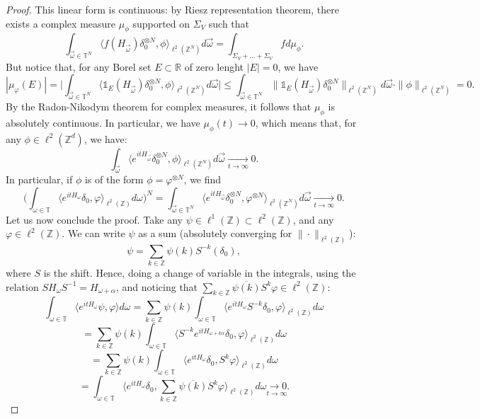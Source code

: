 \documentclass[a4paper]{article}
\theoremstyle{definition}
\begin{document}
\begin{proof}
This linear form is continuous: by Riesz representation theorem, there exists a complex measure $\mu_\phi$ supported on $\Sigma_V$ such that 
$$ \int_{\vec{\omega} \in \mathbb{T}^N} \langle f(H_{\vec{\omega}}) \delta_0^{\otimes N} ,\phi \rangle_{\ell^2(\mathbb{Z}^N)} d\vec{\omega} = \int_{\Sigma_V+\dots +\Sigma_V} f d\mu_\phi. $$
But notice that, for any Borel set $E\subset \mathbb{R}$ of zero lenght $|E|=0$, we have
$$ |\mu_\varphi(E)| = \Big| \int_{\vec{\omega} \in \mathbb{T}^N} \langle \mathbb{1}_E(H_{\vec{\omega}}) \delta_0^{\otimes N},\phi \rangle_{\ell^2(\mathbb{Z}^N)} d\vec{\omega} \Big| \leq \int_{\vec{\omega} \in \mathbb{T}^N} \| \mathbb{1}_E(H_{\vec{\omega}}) \delta_0^{\otimes N} \|_{\ell^2(\mathbb{Z}^N)} d\vec{\omega} \cdot \|\phi \|_{\ell^2(\mathbb{Z}^N)}  = 0. $$
By the Radon-Nikodym theorem for complex measures, it follows that $\mu_\phi$ is absolutely continuous. In particular, we have $ \widehat{\mu_\phi}(t) \rightarrow 0 $, which means that, for any $\phi \in \ell^2(\mathbb{Z}^d)$, we have:
$$ \int_{\vec{\omega}} \langle e^{it H_{\vec{\omega}}} \delta_0^{\otimes N}, \phi \rangle_{\ell^2(\mathbb{Z}^N)} d\vec{\omega} \underset{t \rightarrow \infty}{\longrightarrow} 0 . $$
In particular, if $\phi$ is of the form $\phi=\varphi^{\otimes N}$, we find
$$ \Big(\int_{\omega \in \mathbb{T}} \langle e^{it H_{\omega}} \delta_0, \varphi \rangle_{\ell^2(\mathbb{Z})} d{\omega} \Big)^N = \int_{\vec{\omega} \in \mathbb{T}^N} \langle e^{it H_{\vec{\omega}}} \delta_0^{\otimes N}, \varphi^{\otimes N} \rangle_{\ell^2(\mathbb{Z}^N)} d\vec{\omega} \underset{t \rightarrow \infty}{\longrightarrow} 0. $$
Let us now conclude the proof. Take any $\psi \in \ell^1(\mathbb{Z}) \subset \ell^2(\mathbb{Z})$, and any $\varphi \in \ell^2(\mathbb{Z})$. We can write $\psi$ as a sum (absolutely converging for $\|\cdot\|_{\ell^2(\mathbb{Z})}$):
$$ \psi = \sum_{k \in \mathbb{Z}} \psi(k) S^{-k} (\delta_0), $$
where $S$ is the shift. Hence, doing a change of variable in the integrals, using the relation $S H_\omega S^{-1} = H_{\omega+\alpha}$, and noticing that $\sum_{k \in \mathbb{Z}} \overline{\psi(k)} S^k \varphi \in \ell^2(\mathbb{Z})$:
$$ \int_{\omega \in \mathbb{T}} \langle e^{it H_\omega} \psi,\varphi \rangle d\omega = \sum_{k \in \mathbb{Z}} \psi(k) \int_{\omega \in \mathbb{T}} \langle e^{it H_\omega} S^{-k} \delta_0, \varphi \rangle_{\ell^2(\mathbb{Z})} d\omega  $$
$$ =  \sum_{k \in \mathbb{Z}} \psi(k) \int_{\omega \in \mathbb{T}} \langle S^{-k} e^{it H_{\omega+k\alpha}}  \delta_0, \varphi \rangle_{\ell^2(\mathbb{Z})} d\omega $$
$$ =  \sum_{k \in \mathbb{Z}} \psi(k) \int_{\omega \in \mathbb{T}} \langle  e^{it H_{\omega}}  \delta_0, S^k \varphi \rangle_{\ell^2(\mathbb{Z})} d\omega  $$ $$ = \int_{\omega \in \mathbb{T}} \Big\langle e^{itH_\omega} \delta_0, \sum_{k \in \mathbb{Z}} \overline{\psi(k)} S^k \varphi \Big\rangle_{\ell^2(\mathbb{Z})} d\omega \underset{t \rightarrow \infty}{\longrightarrow 0} .$$
\end{proof}
\end{document}
